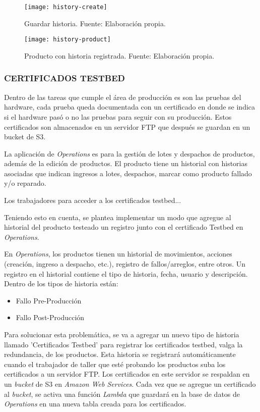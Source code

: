 \begin{figure}[H]
	\centering
	\texttt{[image: history-create]}
	\caption{\label{fig:history-create} Guardar historia. Fuente: Elaboración propia.}
\end{figure}

\begin{figure}[H]
	\centering
	\texttt{[image: history-product]}
	\caption{\label{fig:history-product} Producto con historia registrada. Fuente: Elaboración propia.}
\end{figure}
\iffalse
\subsubsection{CERTIFICADOS TESTBED}

Dentro de las tareas que cumple el área de producción es son las pruebas del hardware, cada prueba queda documentada con
un certificado en donde se indica si el hardware pasó o no las pruebas para seguir con su producción. Estos certificados son
almacenados en un servidor FTP que después se guardan en un bucket de S3.

La aplicación de \textit{Operations} es para la gestión de lotes y despachos de productos, además de la edición de productos.
El producto tiene un historial con historias asociadas que indican ingresos a lotes, despachos, marcar como producto fallado y/o reparado.

Los trabajadores para acceder a los certificados testbed...

Teniendo esto en cuenta, se plantea implementar un modo que agregue al historial del producto testeado un registro junto con el certificado Testbed en \textit{Operations}.

En \textit{Operations}, los productos tienen un historial de movimientos, acciones (creación, ingreso a despacho, etc.), registro de fallos/arreglos, entre otros.
Un registro en el historial contiene el tipo de historia, fecha, usuario y descripción. Dentro de los tipos de historia están:
\begin{itemize}
    \item Fallo Pre-Producción
    \item Fallo Post-Producción
\end{itemize}

Para solucionar esta problemática, se va a agregar un nuevo tipo de historia llamado 'Certificados Testbed' para registrar los certificados testbed, valga la redundancia, de los productos.
Esta historia se registrará automáticamente cuando el trabajador de taller que esté probando los productos suba los certificados a un servidor FTP. Los certificados en este servidor se respaldan en un \textit{bucket} de S3 en \textit{Amazon Web Services}.
Cada vez que se agregue un certificado al \textit{bucket}, se activa una función \textit{Lambda} que guardará en la base de datos de \textit{Operations} en una nueva tabla creada para los certificados.

